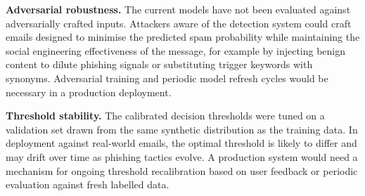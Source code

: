 \textbf{Adversarial robustness.} The current models have not been evaluated against adversarially crafted inputs. Attackers aware of the detection system could craft emails designed to minimise the predicted spam probability while maintaining the social engineering effectiveness of the message, for example by injecting benign content to dilute phishing signals or substituting trigger keywords with synonyms. Adversarial training and periodic model refresh cycles would be necessary in a production deployment.

\textbf{Threshold stability.} The calibrated decision thresholds were tuned on a validation set drawn from the same synthetic distribution as the training data. In deployment against real-world emails, the optimal threshold is likely to differ and may drift over time as phishing tactics evolve. A production system would need a mechanism for ongoing threshold recalibration based on user feedback or periodic evaluation against fresh labelled data.